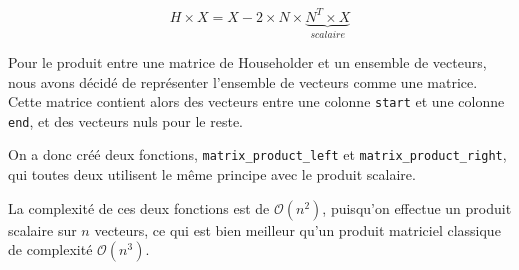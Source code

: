 \begin{equation}
	H \times X = X - 2 \times N \times \underbrace{N^T \times X}_{scalaire}
	\label{eq:vector_product}
\end{equation}

Pour le produit entre une matrice de Householder et un ensemble de vecteurs, nous avons décidé de représenter l'ensemble de vecteurs comme une matrice.
Cette matrice contient alors des vecteurs entre une colonne \verb|start| et une colonne \verb|end|, et des vecteurs nuls pour le reste.

On a donc créé deux fonctions, \verb|matrix_product_left| et \verb|matrix_product_right|, qui toutes deux utilisent le même principe avec le produit scalaire.

La complexité de ces deux fonctions est de $\mathcal{O}(n^2)$, puisqu'on effectue un produit scalaire sur $n$ vecteurs, 
ce qui est bien meilleur qu'un produit matriciel classique de complexité $\mathcal{O}(n^3)$.
